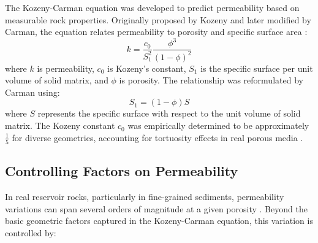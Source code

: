 \documentclass[journal]{IEEEtran}
\begin{document}
The Kozeny-Carman equation was developed to predict permeability based on measurable rock properties. Originally proposed by Kozeny and later modified by Carman, the equation relates permeability to porosity and specific surface area \parencite{chapuis_use_2003}:
\begin{equation}
k = \frac{c_0}{S_1^2}\frac{\phi^3}{(1-\phi)^2}
\end{equation}
\noindent where $k$ is permeability, $c_0$ is Kozeny's constant, $S_1$ is the specific surface per unit volume of solid matrix, and $\phi$ is porosity. The relationship was reformulated by Carman using:
\begin{equation}
S_1 = (1-\phi)S
\end{equation}
\noindent where $S$ represents the specific surface with respect to the unit volume of solid matrix. The Kozeny constant $c_0$ was empirically determined to be approximately $\frac{1}{5}$ for diverse geometries, accounting for tortuosity effects in real porous media \parencite{yang_permeabilityporosity_2010}.

\subsection{Controlling Factors on Permeability}

In real reservoir rocks, particularly in fine-grained sediments, permeability variations can span several orders of magnitude at a given porosity \parencite{yang_permeabilityporosity_2010}. Beyond the basic geometric factors captured in the Kozeny-Carman equation, this variation is controlled by:
\end{document}
